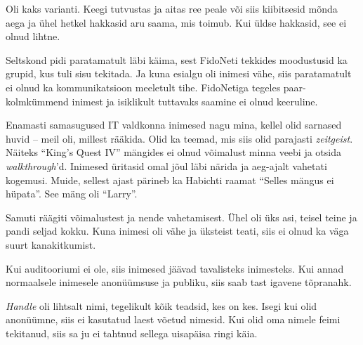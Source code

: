 Oli kaks varianti. Keegi tutvustas ja aitas ree peale või siis kiibitsesid mõnda 
aega ja ühel hetkel hakkasid aru saama, mis toimub. Kui üldse hakkasid, see ei olnud lihtne.


Seltskond pidi paratamatult läbi käima, sest FidoNeti tekkides moodustusid ka grupid, kus tuli sisu 
tekitada. Ja kuna esialgu oli inimesi vähe, siis paratamatult ei olnud ka
kommunikatsioon meeletult tihe. FidoNetiga tegeles 
paar-kolmkümmend inimest ja isiklikult tuttavaks saamine ei olnud keeruline.


Enamasti samasugused IT valdkonna inimesed nagu mina, kellel olid
sarnased huvid -- meil oli, millest rääkida. Olid ka 
teemad, mis siis olid parajasti \emph{zeitgeist}. 
Näiteks \enquote{King's Quest 
IV} mängides ei olnud võimalust minna 
veebi ja otsida \emph{walkthrough}'d. Inimesed üritasid omal jõul 
läbi närida ja aeg-ajalt vahetati kogemusi. Muide, sellest ajast pärineb 
ka Habichti raamat \enquote{Selles mängus ei hüpata}. 
See mäng oli 
\enquote{Larry}.

Samuti räägiti võimalustest ja nende 
vahetamisest. Ühel oli üks asi, teisel teine ja pandi seljad kokku. Kuna 
inimesi oli vähe ja üksteist teati, siis ei olnud ka väga 
suurt kanakitkumist.


Kui auditooriumi ei ole, siis inimesed jäävad tavalisteks inimesteks. Kui 
annad normaalsele inimesele anonüümsuse ja publiku, siis saab tast igavene 
tõpranahk.


\emph{Handle} oli lihtsalt nimi, tegelikult kõik teadsid, kes on kes. 
Isegi kui olid anonüümne, siis ei 
kasutatud laest võetud nimesid. Kui olid oma nimele
feimi tekitanud, siis sa ju ei tahtnud sellega 
uisapäisa ringi käia.

